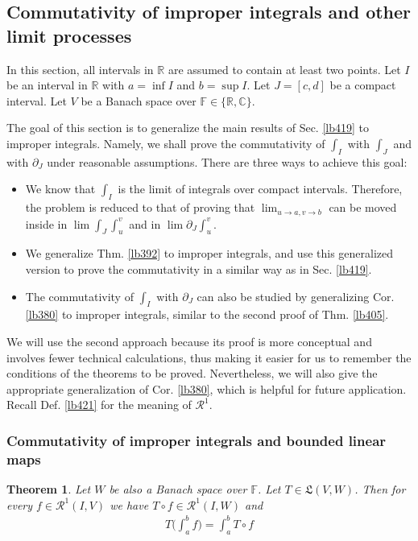 \documentclass[12pt,b5paper,notitlepage]{article}
\theoremstyle{definition}
\theoremstyle{plain}
\newtheorem{thm}[df]{Theorem}
\newcommand{\fk}{\mathfrak}
\newcommand{\scr}{\mathscr}
\newcommand{\Cbb}{\mathbb C}
\newcommand{\Rbb}{\mathbb R}
\newcommand{\Fbb}{\mathbb F}
\numberwithin{equation}{section}
\begin{document}
\subsection{Commutativity of improper integrals and other limit processes}



In this section, all intervals in $\Rbb$ are assumed to contain at least two points. Let $I$ be an interval in $\Rbb$ with $a=\inf I$ and $b=\sup I$. Let $J=[c,d]$ be a compact interval. Let $V$ be a Banach space over $\Fbb\in\{\Rbb,\Cbb\}$.

The goal of this section is to generalize the main results of Sec. \ref{lb419} to improper integrals. Namely, we shall prove the commutativity of $\int_I$ with $\int_J$ and with $\partial_J$ under reasonable assumptions. There are three ways to achieve this goal: 
\begin{itemize}
\item We know that $\int_I$ is the limit of integrals over compact intervals. Therefore, the problem is reduced to that of proving that $\lim_{u\rightarrow a,v\rightarrow b}$ can be moved inside in  $\lim\int_J\int_u^v$ and in $\lim\partial_J\int_u^v$.
\item We generalize Thm. \ref{lb392} to improper integrals, and use this generalized version to prove the commutativity in a similar way as in Sec. \ref{lb419}.
\item The commutativity of $\int_I$ with $\partial_J$ can also be studied by generalizing Cor. \ref{lb380} to improper integrals, similar to the second proof of Thm. \ref{lb405}.
\end{itemize}



We will use the second approach because its proof is more conceptual and involves fewer technical calculations, thus making it easier for us to remember the conditions of the theorems to be proved. Nevertheless, we will also give the appropriate generalization of Cor. \ref{lb380}, which is helpful for future application. Recall Def. \ref{lb421} for the meaning of $\scr R^1$. 


\subsubsection{Commutativity of improper integrals and bounded linear maps}



\begin{thm}\label{lb420}
Let $W$ be also a Banach space over $\Fbb$. Let $T\in\fk L(V,W)$. Then for every $f\in\scr R^1(I,V)$ we have $T\circ f\in\scr R^1(I,W)$ and
\begin{align}
T\Big(\int_a^b f \Big)=\int_a^b T\circ f
\end{align}
\end{thm}
\end{document}
